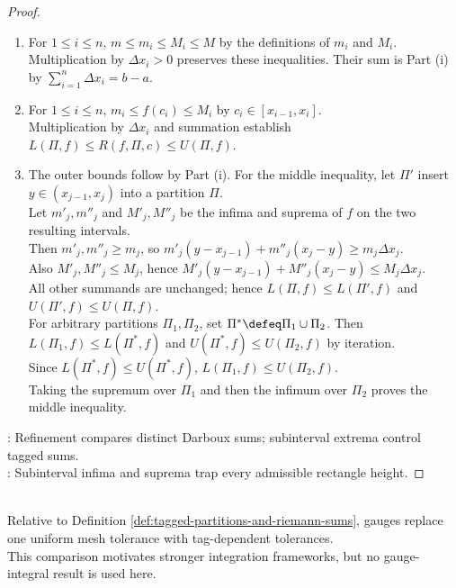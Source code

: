 \begin{proof}
\begin{enumerate}[label=(\roman*)]
\setlength{\itemsep}{0pt}
\item For $1\leq i\leq n$, $m\leq m_i\leq M_i\leq M$ by the definitions of $m_i$ and $M_i$.\\
Multiplication by $\Delta x_i>0$ preserves these inequalities. Their sum is Part (i) by $\sum\limits_{i=1}^{n}\Delta x_i=b-a$.
\item For $1\leq i\leq n$, $m_i\leq f(c_i)\leq M_i$ by $c_i\in[x_{i-1},x_i]$.\\
Multiplication by $\Delta x_i$ and summation establish $L(\Pi,f)\leq R(f,\Pi,c)\leq U(\Pi,f)$.
\item The outer bounds follow by Part (i). For the middle inequality, let $\Pi'$ insert $y\in(x_{j-1},x_j)$ into a partition $\Pi$.\\
Let $m'_j,m''_j$ and $M'_j,M''_j$ be the infima and suprema of $f$ on the two resulting intervals.\\
Then $m'_j,m''_j\geq m_j$, so $m'_j(y-x_{j-1})+m''_j(x_j-y)\geq m_j\Delta x_j$.\\
Also $M'_j,M''_j\leq M_j$, hence $M'_j(y-x_{j-1})+M''_j(x_j-y)\leq M_j\Delta x_j$.\\
All other summands are unchanged; hence $L(\Pi,f)\leq L(\Pi',f)$ and $U(\Pi',f)\leq U(\Pi,f)$.\\
For arbitrary partitions $\Pi_1,\Pi_2$, set $\Pi^\ast\defeq\Pi_1\cup\Pi_2$. Then $L(\Pi_1,f)\leq L(\Pi^\ast,f)$ and $U(\Pi^\ast,f)\leq U(\Pi_2,f)$ by iteration.\\
Since $L(\Pi^\ast,f)\leq U(\Pi^\ast,f)$, $L(\Pi_1,f)\leq U(\Pi_2,f)$.\\
Taking the supremum over $\Pi_1$ and then the infimum over $\Pi_2$ proves the middle inequality.
\end{enumerate}
: Refinement compares distinct Darboux sums; subinterval extrema control tagged sums.\\
: Subinterval infima and suprema trap every admissible rectangle height.
\end{proof}

\begin{perspective} \label{per:gauge-integral-context} \\
Relative to Definition \ref{def:tagged-partitions-and-riemann-sums}, gauges replace one uniform mesh tolerance with tag-dependent tolerances.\\
This comparison motivates stronger integration frameworks, but no gauge-integral result is used here.
\end{perspective}
